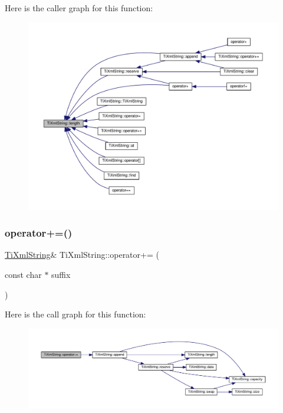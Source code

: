 Here is the caller graph for this function\+:
\nopagebreak
\begin{figure}[H]
\begin{center}
\leavevmode
\includegraphics[width=350pt]{class_ti_xml_string_a5db17f8314ffe2a89df0f0eb6c2a4bf5_icgraph}
\end{center}
\end{figure}
\mbox{\label{class_ti_xml_string_ab56336ac2aa2a08d24a71eb9a2b502a5}} 
\subsubsection{\texorpdfstring{operator+=()}{operator+=()}\hspace{0.1cm}{\footnotesize\ttfamily [1/3]}}
{\footnotesize\ttfamily \hyperlink{class_ti_xml_string}{Ti\+Xml\+String}\& Ti\+Xml\+String\+::operator+= (\begin{DoxyParamCaption}\item[{const char $\ast$}]{suffix }\end{DoxyParamCaption})\hspace{0.3cm}{\ttfamily [inline]}}

Here is the call graph for this function\+:
\nopagebreak
\begin{figure}[H]
\begin{center}
\leavevmode
\includegraphics[width=350pt]{class_ti_xml_string_ab56336ac2aa2a08d24a71eb9a2b502a5_cgraph}
\end{center}
\end{figure}
\mbox{\label{class_ti_xml_string_a6aa09d5240470b76d54ec709e04f8c13}} 
